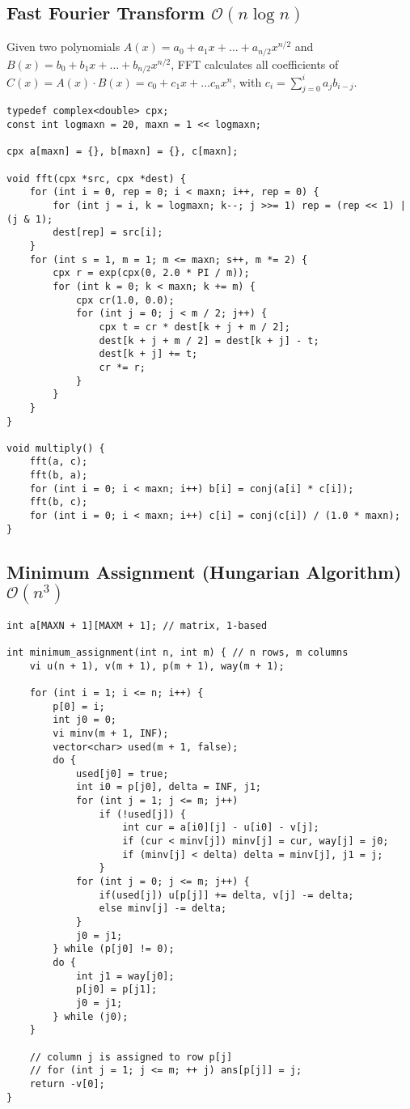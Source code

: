 \documentclass{article}
\begin{document}
\subsection{Fast Fourier Transform $\mathcal{O}(n \log n)$}

Given two polynomials $A(x) = a_0 + a_1 x + \dots + a_{n/2} x^{n/2}$ and $B(x) = b_0 + b_1 x + \dots + b_{n/2} x^{n/2}$, FFT calculates all coefficients of $C(x) = A(x) \cdot B(x) = c_0 + c_1 x + \dots c_{n} x^{n}$, with $c_i = \sum_{j=0}^{i} a_j b_{i-j}$.

\begin{lstlisting}
typedef complex<double> cpx;
const int logmaxn = 20, maxn = 1 << logmaxn;

cpx a[maxn] = {}, b[maxn] = {}, c[maxn];

void fft(cpx *src, cpx *dest) {
	for (int i = 0, rep = 0; i < maxn; i++, rep = 0) {
		for (int j = i, k = logmaxn; k--; j >>= 1) rep = (rep << 1) | (j & 1);
		dest[rep] = src[i];
	}
	for (int s = 1, m = 1; m <= maxn; s++, m *= 2) {
		cpx r = exp(cpx(0, 2.0 * PI / m));
		for (int k = 0; k < maxn; k += m) {
			cpx cr(1.0, 0.0);
			for (int j = 0; j < m / 2; j++) {
				cpx t = cr * dest[k + j + m / 2];
				dest[k + j + m / 2] = dest[k + j] - t;
				dest[k + j] += t;
				cr *= r;
			}
		}
	}
}

void multiply() {
	fft(a, c);
	fft(b, a);
	for (int i = 0; i < maxn; i++) b[i] = conj(a[i] * c[i]);
	fft(b, c);
	for (int i = 0; i < maxn; i++) c[i] = conj(c[i]) / (1.0 * maxn);
}
\end{lstlisting}

\subsection{Minimum Assignment (Hungarian Algorithm) $\mathcal{O}(n^{3})$}

\begin{lstlisting}
int a[MAXN + 1][MAXM + 1]; // matrix, 1-based

int minimum_assignment(int n, int m) { // n rows, m columns
	vi u(n + 1), v(m + 1), p(m + 1), way(m + 1);

	for (int i = 1; i <= n; i++) {
		p[0] = i;
		int j0 = 0;
		vi minv(m + 1, INF);
		vector<char> used(m + 1, false);
		do {
			used[j0] = true;
			int i0 = p[j0], delta = INF, j1;
			for (int j = 1; j <= m; j++)
				if (!used[j]) {
					int cur = a[i0][j] - u[i0] - v[j];
					if (cur < minv[j]) minv[j] = cur, way[j] = j0;
					if (minv[j] < delta) delta = minv[j], j1 = j;
				}
			for (int j = 0; j <= m; j++) {
				if(used[j]) u[p[j]] += delta, v[j] -= delta;
				else minv[j] -= delta;
			}
			j0 = j1;
		} while (p[j0] != 0);
		do {
			int j1 = way[j0];
			p[j0] = p[j1];
			j0 = j1;
		} while (j0);
	}

	// column j is assigned to row p[j]
	// for (int j = 1; j <= m; ++ j) ans[p[j]] = j;
	return -v[0];
}
\end{lstlisting}
\end{document}
